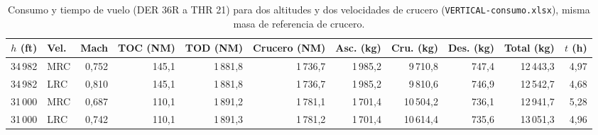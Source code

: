 \begin{table}[htbp]
\centering
\scriptsize\setlength{\tabcolsep}{3.5pt}
\caption{Consumo y tiempo de vuelo (DER 36R a THR 21) para dos altitudes y dos velocidades de crucero (\texttt{VERTICAL-consumo.xlsx}), misma masa de referencia de crucero.}\label{tab:consumo}
\begin{tabular}{rlrrrrrrrrr}
\toprule
$h$ (ft) & Vel. & Mach & TOC (NM) & TOD (NM) & Crucero (NM) & Asc. (kg) & Cru. (kg) & Des. (kg) & Total (kg) & $t$ (h)\\
\midrule
34\,982 & MRC & 0,752 & 145,1 & 1\,881,8 & 1\,736,7 & 1\,985,2 & 9\,710,8 & 747,4 & 12\,443,3 & 4,97\\
34\,982 & LRC & 0,810 & 145,1 & 1\,881,8 & 1\,736,7 & 1\,985,2 & 9\,810,6 & 746,9 & 12\,542,7 & 4,68\\
31\,000 & MRC & 0,687 & 110,1 & 1\,891,2 & 1\,781,1 & 1\,701,4 & 10\,504,2 & 736,1 & 12\,941,7 & 5,28\\
31\,000 & LRC & 0,742 & 110,1 & 1\,891,3 & 1\,781,2 & 1\,701,4 & 10\,614,4 & 735,6 & 13\,051,3 & 4,96\\
\bottomrule
\end{tabular}
\end{table}
